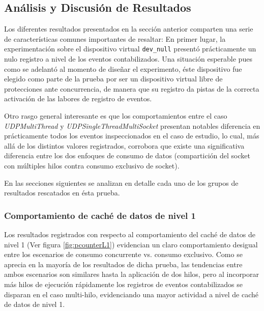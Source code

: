 \newpage

\subsection{Análisis y Discusión de Resultados}

Los diferentes resultados presentados en la sección anterior comparten una serie de características comunes importantes de resaltar: En primer lugar, la experimentación sobre el dispositivo virtual \verb=dev_null= presentó prácticamente un nulo registro a nivel de los eventos contabilizados. Una situación esperable pues como se adelantó al momento de diseñar el experimento, éste dispositivo fue elegido como parte de la prueba por ser un dispositivo virtual libre de protecciones ante concurrencia, de manera que su registro da pistas de la correcta activación de las labores de registro de eventos.

Otro rasgo general interesante es que los comportamientos entre el caso \emph{UDPMultiThread} y \emph{UDPSingleThreadMultiSocket} presentan notables diferencia en prácticamente todos los eventos inspeccionados en el caso de estudio, lo cual, más allá de los distintos valores registrados, corrobora que existe una significativa diferencia entre los dos enfoques de consumo de datos (compartición del socket con múltiples hilos contra consumo exclusivo de socket).

En las secciones siguientes se analizan en detalle cada uno de los grupos de resultados rescatados en ésta prueba.

\subsubsection{Comportamiento de caché de datos de nivel 1}
Los resultados registrados con respecto al comportamiento del caché de datos de nivel 1 (Ver figura \ref{fig:pcounterL1}) evidencian un claro comportamiento desigual entre los escenarios de consumo concurrente vs. consumo exclusivo. Como se aprecia en la mayoría de los resultados de dicha prueba, las tendencias entre ambos escenarios son similares hasta la aplicación de dos hilos, pero al incorporar más hilos de ejecución rápidamente los registros de eventos contabilizados se disparan en el caso multi-hilo, evidenciando una mayor actividad a nivel de caché de datos de nivel 1.

